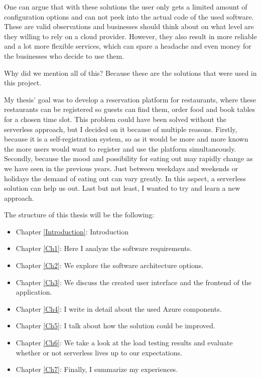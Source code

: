 One can argue that with these solutions the user only gets a limited amount of configuration options and can not peek into the actual code of the used software. These are valid observations and businesses should think about on what level are they willing to rely on a cloud provider. However, they also result in more reliable and a lot more flexible services, which can spare a headache and even money for the businesses who decide to use them.

Why did we mention all of this? Because these are the solutions that were used in this project.

My thesis' goal was to develop a reservation platform for restaurants, where these restaurants can be registered so guests can find them, order food and book tables for a chosen time slot. 
This problem could have been solved without the serverless approach, but I decided on it because of multiple reasons. Firstly, because it is a self-registration system, so as it would be more and more known the more users would want to register and use the platform simultaneously. Secondly, because the mood and possibility for eating out may rapidly change as we have seen in the previous years. Just between weekdays and weekends or holidays the demand of eating out can vary greatly. In this aspect, a serverless solution can help us out. Last but not least, I wanted to try and learn a new approach.

The structure of this thesis will be the following: 
 \begin{itemize}
 	\item Chapter \ref{Introduction}: Introduction
	\item Chapter \ref{Ch1}: Here I analyze the software requirements. 
	\item Chapter \ref{Ch2}: We explore the software architecture options.
	\item Chapter \ref{Ch3}: We discuss the created user interface and the frontend of the application.
	\item Chapter \ref{Ch4}: I write in detail about the used Azure components.
	\item Chapter \ref{Ch5}: I talk about how the solution could be improved.
	\item Chapter \ref{Ch6}: We take a look at the load testing results and evaluate whether or not serverless lives up to our expectations.
	\item Chapter \ref{Ch7}: Finally, I summarize my experiences.
\end{itemize}